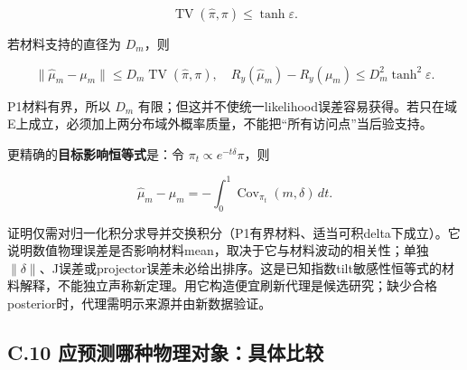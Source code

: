 \documentclass[
  11pt,
  a4paper,
]{article}
\begin{document}
\[
\operatorname{TV}(\widehat\pi,\pi)\le\tanh\varepsilon.
\]

若材料支持的直径为 \(D_m\)，则

\[
\|\widehat\mu_m-\mu_m\|\le D_m\operatorname{TV}(\widehat\pi,\pi),
\quad R_y(\widehat\mu_m)-R_y(\mu_m)\le D_m^2\tanh^2\varepsilon.
\]

P1材料有界，所以 \(D_m\)
有限；但这并不使统一likelihood误差容易获得。若只在域E上成立，必须加上两分布域外概率质量，不能把``所有访问点''当后验支持。

更精确的\textbf{目标影响恒等式}是：令
\(\pi_t\propto e^{-t\delta}\pi\)，则

\[
\widehat\mu_m-\mu_m=-\int_0^1\operatorname{Cov}_{\pi_t}(m,\delta)\,dt.
\]

证明仅需对归一化积分求导并交换积分（P1有界材料、适当可积delta下成立）。它说明数值物理误差是否影响材料mean，取决于它与材料波动的相关性；单独
\(\|\delta\|\)、J误差或projector误差未必给出排序。这是已知指数tilt敏感性恒等式的材料解释，不能独立声称新定理。用它构造便宜刷新代理是候选研究；缺少合格posterior时，代理需明示来源并由新数据验证。

\hypertarget{c.10-ux5e94ux9884ux6d4bux54eaux79cdux7269ux7406ux5bf9ux8c61ux5177ux4f53ux6bd4ux8f83}{%
\subsection{C.10
应预测哪种物理对象：具体比较}\label{c.10-ux5e94ux9884ux6d4bux54eaux79cdux7269ux7406ux5bf9ux8c61ux5177ux4f53ux6bd4ux8f83}}
\end{document}
